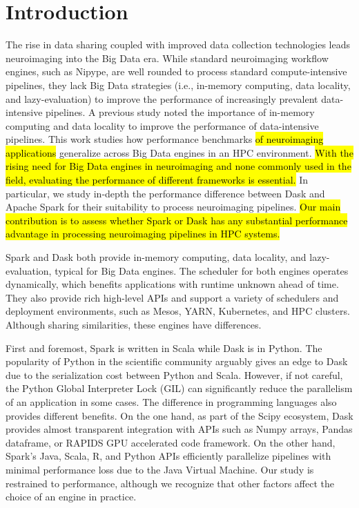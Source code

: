 \documentclass[AMA,STIX1COL]{WileyNJD-v2}
\newcommand{\HL}[1]{\hl{#1}}
\begin{document}
\section{Introduction}
The rise in data sharing coupled with improved data collection technologies leads neuroimaging into the Big Data era\cite{ALFAROALMAGRO2018400, van2014human, ConpPortal}.
While standard neuroimaging workflow engines, such as Nipype\cite{Nipype:11}, are well rounded to process standard compute-intensive pipelines,
they lack Big Data strategies (i.e., in-memory computing, data locality, and lazy-evaluation) to improve the performance of increasingly prevalent data-intensive pipelines.
A previous study\cite{8752675} noted the importance of in-memory computing and data locality to improve the performance of data-intensive pipelines.
This work studies how performance benchmarks \HL{of neuroimaging applications} generalize across Big Data engines in an HPC environment.
\HL{
	With the rising need for Big Data engines in neuroimaging and none commonly
	used in the field, evaluating the performance of different frameworks is essential.
}
In particular, we study in-depth the performance difference between Dask\cite{Dask:15} and Apache Spark\cite{Spark:16} for their suitability to process neuroimaging pipelines.
\HL{
	Our main contribution is to assess whether Spark or Dask has any substantial performance advantage in processing neuroimaging pipelines in HPC systems.
}
	
Spark and Dask both provide in-memory computing, data locality, and lazy-evaluation, typical for Big Data engines.
The scheduler for both engines operates dynamically, which benefits applications with runtime unknown ahead of time\cite{Dask:15}.
They also provide rich high-level APIs and support a variety of schedulers and deployment environments, such as Mesos\cite{hindman2011mesos}, YARN\cite{vavilapalli2013apache}, Kubernetes, and HPC clusters.
Although sharing similarities, these engines have differences.
	
First and foremost, Spark is written in Scala while Dask is in Python.
The popularity of Python in the scientific community arguably gives an edge to Dask due to the serialization cost between Python and Scala.
However, if not careful, the Python Global Interpreter Lock (GIL) can significantly reduce the parallelism of an application in some cases.
The difference in programming languages also provides different benefits.
On the one hand, as part of the Scipy ecosystem, Dask provides almost transparent integration with APIs such as Numpy arrays, Pandas dataframe, or RAPIDS GPU accelerated code framework.
On the other hand, Spark's Java, Scala, R, and Python APIs efficiently parallelize pipelines with minimal performance loss due to the Java Virtual Machine.
Our study is restrained to performance, although we recognize that other factors affect the choice of an engine in practice.
	
\end{document}
